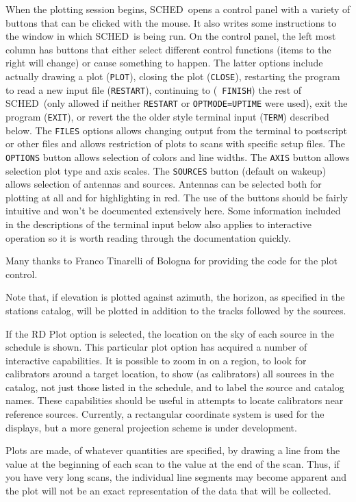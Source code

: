 \documentclass{report}
\newcommand{\schedb}{{\sc SCHED~}}
\begin{document}
When the plotting session begins, \schedb opens a control panel with a
variety of buttons that can be clicked with the mouse.  It also writes
some instructions to the window in which \schedb is being run.  On the
control panel, the left most column has buttons that either select
different control functions (items to the right will change) or cause
something to happen.  The latter options include actually drawing a
plot ({\tt PLOT}), closing the plot ({\tt CLOSE}), restarting the
program to read a new input file ({\tt RESTART}), continuing to ({\tt
FINISH}) the rest of \schedb (only allowed if neither {\tt RESTART} or
{\tt OPTMODE=UPTIME} were used), exit the program ({\tt EXIT}), or
revert the the older style terminal input ({\tt TERM}) described
below.  The {\tt FILES} options allows changing output from the
terminal to postscript or other files and allows restriction of plots
to scans with specific setup files.  The {\tt OPTIONS} button allows
selection of colors and line widths.  The {\tt AXIS} button allows
selection plot type and axis scales.  The {\tt SOURCES} button
(default on wakeup) allows selection of antennas and sources.
Antennas can be selected both for plotting at all and for highlighting
in red.  The use of the buttons should be fairly intuitive and won't
be documented extensively here.  Some information included in the
descriptions of the terminal input below also applies to interactive
operation so it is worth reading through the documentation quickly.

Many thanks to Franco Tinarelli of Bologna for providing the code
for the plot control.

Note that, if elevation is plotted against azimuth, the horizon, as
specified in the stations catalog, will be plotted in addition to the
tracks followed by the sources.

If the RD Plot option is selected, the location on the sky of each
source in the schedule is shown.  This particular plot option has
acquired a number of interactive capabilities.  It is possible to
zoom in on a region, to look for calibrators around a target location,
to show (as calibrators) all sources in the catalog, not just those
listed in the schedule, and to label the source and catalog names.
These capabilities should be useful in attempts to locate calibrators
near reference sources.  Currently, a rectangular coordinate system
is used for the displays, but a more general projection scheme is
under development.

Plots are made, of whatever quantities are specified, by drawing
a line from the value at the beginning of each scan to the value
at the end of the scan.  Thus, if you have very long scans, the
individual line segments may become apparent and the plot will not
be an exact representation of the data that will be collected.
\end{document}
